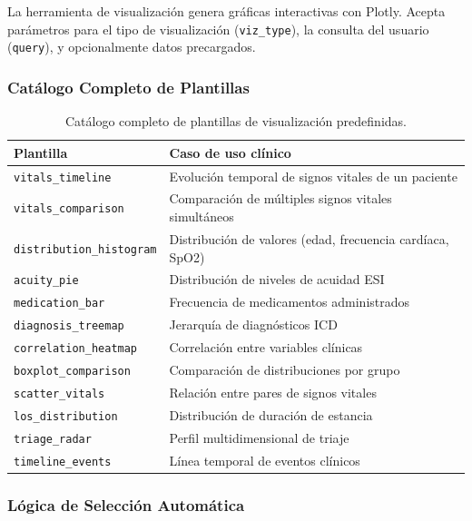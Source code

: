 La herramienta de visualización genera gráficas interactivas con Plotly. Acepta parámetros para el tipo de visualización (\texttt{viz\_type}), la consulta del usuario (\texttt{query}), y opcionalmente datos precargados.

\subsubsection{Catálogo Completo de Plantillas}

\begin{table}[H]
\centering
\caption{Catálogo completo de plantillas de visualización predefinidas.}
\label{tab:appendix_templates}
\footnotesize
\begin{tabularx}{\columnwidth}{lX}
\toprule
\textbf{Plantilla} & \textbf{Caso de uso clínico} \\
\midrule
\texttt{vitals\_timeline} & Evolución temporal de signos vitales de un paciente \\
\texttt{vitals\_comparison} & Comparación de múltiples signos vitales simultáneos \\
\texttt{distribution\_histogram} & Distribución de valores (edad, frecuencia cardíaca, SpO2) \\
\texttt{acuity\_pie} & Distribución de niveles de acuidad \ac{ESI} \\
\texttt{medication\_bar} & Frecuencia de medicamentos administrados \\
\texttt{diagnosis\_treemap} & Jerarquía de diagnósticos \ac{ICD} \\
\texttt{correlation\_heatmap} & Correlación entre variables clínicas \\
\texttt{boxplot\_comparison} & Comparación de distribuciones por grupo \\
\texttt{scatter\_vitals} & Relación entre pares de signos vitales \\
\texttt{los\_distribution} & Distribución de duración de estancia \\
\texttt{triage\_radar} & Perfil multidimensional de triaje \\
\texttt{timeline\_events} & Línea temporal de eventos clínicos \\
\bottomrule
\end{tabularx}
\end{table}

\subsubsection{Lógica de Selección Automática}

